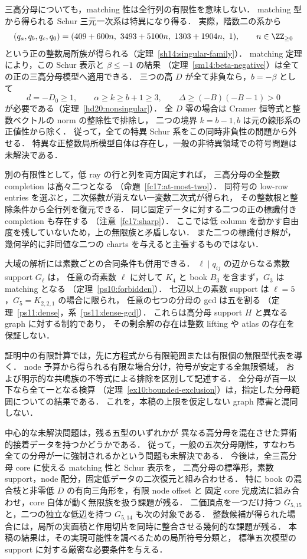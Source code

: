 三高分母についても，matching 性は全行列の有限性を意味しない．
matching 型から得られる Schur 三元一次系は特異になり得る．
実際，階数二の系から
\[
 (q_a,q_b,q_c,q_0)
 =(409+600n,\ 3493+5100n,\ 1303+1904n,\ 1),
 \qquad n\in\ZZ_{\ge0}
\]
という正の整数局所族が得られる（定理~\ref{sh14:singular-family}）．
matching 定理により，この Schur 表示と $\beta\le-1$ の結果
（定理~\ref{sm14:beta-negative}）は全ての正の三高分母模型へ適用できる．
三つの高 $D$ が全て非負なら，$b=-\beta$ として
\[
 d=-D_0\ge1,\qquad \alpha\ge k\ge b+1\ge3,
 \qquad \Delta\ge(-B)(-B-1)>0
\]
が必要である（定理~\ref{hd20:nonsingular}）．
全 $D$ 零の場合は Cramer 恒等式と整数ベクトルの norm の整除性で排除し，
二つの境界 $k=b-1,b$ は元の線形系の正値性から除く．
従って，全ての特異 Schur 系をこの同時非負性の問題から外せる．
特異な正整数局所模型自体は存在し，一般の非特異領域での符号問題は未解決である．

別の有限性として，低 ray の行と列を両方固定すれば，
三高分母の全整数 completion は高々二つとなる
（命題~\ref{fc17:at-most-two}）．
同符号の low-row entries を選ぶと，二次係数が消えない一変数二次式が得られ，
その整数根と整除条件から全行列を復元できる．
同じ固定データに対する二つの正の標識付き completion も存在する
（注意~\ref{fc17:sharp}）．
ここでは低 column を動かす自由度を残していないため，上の無限族と矛盾しない．
また二つの標識付き解が，幾何学的に非同値な二つの charts を与えると主張するものではない．

大域の解析には素数ごとの合同条件も併用できる．
$\ell\mid q_{ij}$ の辺からなる素数 support $G_\ell$ は，
任意の奇素数 $\ell$ に対して $K_4$ と book $B_3$ を含まず，$G_3$ は matching となる
（定理~\ref{ps10:forbidden}）．
七辺以上の素数 support は $\ell=5$，$G_5=K_{2,2,1}$ の場合に限られ，
任意の七つの分母の gcd は五を割る
（定理~\ref{ps11:dense}，系~\ref{ps11:dense-gcd}）．
これらは高分母 support $H$ と異なる graph に対する制約であり，
その剰余解の存在は整数 lifting や atlas の存在を保証しない．

証明中の有限計算では，先に方程式から有限範囲または有限個の無限型代表を導く．
node 予算から得られる有限な場合分け，符号が安定する全無限領域，
および明示的な共鳴族の不等式による排除を区別して記述する．
全分母が百一以下なら全て一となる検算
（定理~\ref{ex10:bounded-exclusion}）は，指定した分母範囲についての結果である．
これを，本稿の上限を仮定しない graph 障害と混同しない．

中心的な未解決問題は，残る五型のいずれかが
異なる高分母を混在させた算術的接着データを持つかどうかである．
従って，一般の五次分母剛性，すなわち全ての分母が一に強制されるかという問題も未解決である．
今後は，全三高分母 core に使える matching 性と Schur 表示を，
二高分母の標準形，素数 support，node 配分，固定低データの二次復元と組み合わせる．
特に book の混合枝と非零低 $D$ の有向三角形を，有限 node offset と
固定 core 完成法に組み合わせ，core 自体が動く無限族を扱う課題が残る．
二価頂点を一つだけ持つ $G_{5,15}$ と，二つの独立な低辺を持つ $G_{5,14}$ も次の対象である．
整数候補が得られた場合には，局所の実面積と作用切片を同時に整合させる幾何的な課題が残る．
本稿の結果は，その実現可能性を調べるための局所符号分類と，
標準五次模型の support に対する厳密な必要条件を与える．
